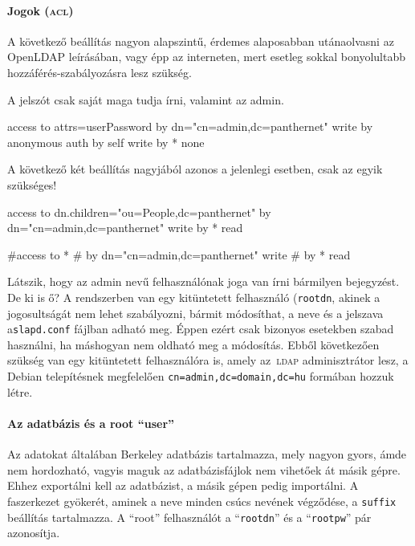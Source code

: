 \paragraph{Jogok (\textsc{acl})} A következő beállítás nagyon alapszintű, érdemes alaposabban utánaolvasni az OpenLDAP
leírásában, vagy épp az interneten, mert esetleg sokkal bonyolultabb hozzáférés-szabályozásra lesz szükség.

A jelszót csak saját maga tudja írni, valamint az admin.

\begin{VerbExample}
access to attrs=userPassword
    by dn="cn=admin,dc=panthernet" write
    by anonymous auth
    by self write
    by * none
\end{VerbExample}    

A következő két beállítás nagyjából azonos a jelenlegi esetben, csak az egyik szükséges!

\begin{VerbExample}
 access to dn.children="ou=People,dc=panthernet"
        by dn="cn=admin,dc=panthernet" write
        by * read

#access to *
#        by dn="cn=admin,dc=panthernet" write
#        by * read
\end{VerbExample}


Látszik, hogy az admin nevű felhasználónak joga van írni bármilyen bejegyzést. De ki is ő? A rendszerben van egy
kitüntetett felhasználó (\texttt{rootdn}, akinek a jogosultságát nem lehet szabályozni, bármit módosíthat, a
neve és a jelszava a\texttt{slapd.conf} fájlban adható meg. Éppen ezért csak bizonyos esetekben szabad használni, ha
máshogyan nem oldható meg a módosítás. Ebből következően szükség van egy kitüntetett felhasználóra is, amely az~\textsc{ldap}
adminisztrátor lesz, a Debian telepítésnek megfelelően \texttt{cn=admin,dc=domain,dc=hu} formában hozzuk létre.


\paragraph{Az adatbázis és a root ``user''} Az adatokat általában Berkeley adatbázis tartalmazza, mely nagyon
gyors, ámde nem hordozható, vagyis maguk az adatbázisfájlok nem vihetőek át másik gépre. Ehhez exportálni kell az
adatbázist, a másik gépen pedig importálni. A faszerkezet gyökerét, aminek a neve minden csúcs nevének végződése, a
\texttt{suffix} beállítás tartalmazza. A ``root'' felhasználót a ``\texttt{rootdn}'' és a ``\texttt{rootpw}'' pár
azonosítja.

